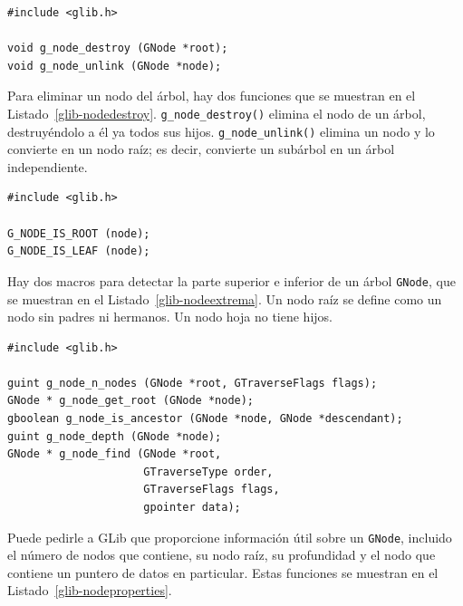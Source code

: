 \begin{lstlisting}[float, caption={Destroying a \lstinline{GNode}}, label=glib-nodedestroy]
#include <glib.h>

void g_node_destroy (GNode *root);
void g_node_unlink (GNode *node);
\end{lstlisting}

Para eliminar un nodo del árbol, hay dos funciones que se muestran en el Listado~\ref{glib-nodedestroy}. \lstinline{g_node_destroy()} elimina el nodo de un árbol, destruyéndolo a él ya todos sus hijos. \lstinline{g_node_unlink()} elimina un nodo y lo convierte en un nodo raíz; es decir, convierte un subárbol en un árbol independiente.

\begin{lstlisting}[float, caption={Predicates for \lstinline{GNode}}, label=glib-nodeextrema]
#include <glib.h>

G_NODE_IS_ROOT (node);
G_NODE_IS_LEAF (node);
\end{lstlisting}

Hay dos macros para detectar la parte superior e inferior de un árbol \lstinline{GNode}, que se muestran en el Listado~\ref{glib-nodeextrema}. Un nodo raíz se define como un nodo sin padres ni hermanos. Un nodo hoja no tiene hijos.

\begin{lstlisting}[float, caption={\lstinline{GNode} properties}, label=glib-nodeproperties]
#include <glib.h>

guint g_node_n_nodes (GNode *root, GTraverseFlags flags);
GNode * g_node_get_root (GNode *node);
gboolean g_node_is_ancestor (GNode *node, GNode *descendant);
guint g_node_depth (GNode *node);
GNode * g_node_find (GNode *root,
                     GTraverseType order,
                     GTraverseFlags flags,
                     gpointer data);
\end{lstlisting}

Puede pedirle a GLib que proporcione información útil sobre un \lstinline{GNode}, incluido el número de nodos que contiene, su nodo raíz, su profundidad y el nodo que contiene un puntero de datos en particular. Estas funciones se muestran en el Listado~\ref{glib-nodeproperties}.

